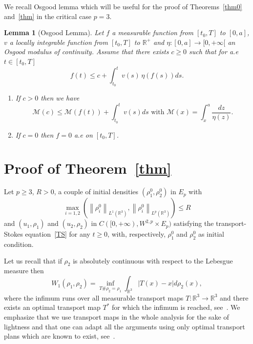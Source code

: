 \documentclass[10pt]{amsart}
\newtheorem{lemm}[theo]{Lemma}\newtheorem{prop}[theo]{Proposition}\newtheorem{coro}[theo]{Corollary}\newtheorem{conj}[theo]{Conjecture}
\theoremstyle{definition}\newtheorem{defi}[theo]{Definition}\newtheorem{rema}[theo]{Remark}\newtheorem{exam}[theo]{Example}\newtheorem{exem}[theo]{Example}\newtheorem{nota}[theo]{Notation}
\newcommand{\R}{\mathbb{R}}
\newcommand{\clM}{\mathcal{M}}
\renewcommand{\leq}{\leqslant}
\renewcommand{\geq}{\geqslant}
\begin{document}
We recall Osgood lemma which will be useful for the proof of Theorems~\ref{thm0} and~\ref{thm} in the critical case $p=3$.

\begin{lemm}[Osgood Lemma]\label{Osgood}
Let $f$ a measurable function from $[t_0,T]$ to $[0,a]$, $v$ a locally integrable function from $[t_0,T]$ to $\R^+$ and $ \eta: [0,a] \to [0,+\infty[$ an Osgood modulus of continuity. Assume that there exists $c \geq0$ such that for a.e $t\in[t_0,T]$
\[
f(t) \leq c+\int_{t_0}^t v(s)\, \eta(f(s)) ds.
\]
\begin{enumerate}
\item\label{lemm3.8.1} If $c>0$ then we have
\[
\clM(c) \leq \clM(f(t)) + \int_{t_0}^t v(s) ds \text{ with } \clM(x)=\int_x^a \frac{dz}{\eta(z)}.
\]
\item\label{lemm3.8.2} If $c=0$ then $f=0$ a.e on $[t_0,T]$.
\end{enumerate}
\end{lemm}



\section{Proof of Theorem~\ref{thm} }\label{sec-stabb}

Let $p\geq 3$, $R>0$, a couple of initial densities
$ (\rho_1^0, \rho_2^0)$ in $E_p $ with
\[
\max_{i=1,2} \left(\left\|\rho_i^0\right\|_{ L^1\left(\R^3\right)}, \left\|\rho_i^0\right\|_{ L^p \left(\R^3\right)}\right) \leq R
\]
and $ (u_1,\rho_1) $ and $ (u_2,\rho_2) $ in $C([0,+\infty),W^{2,p} \times E_p)$ satisfying the transport-Stokes equation~\eqref{TS} for any $t\geq 0$, with, respectively, $ \rho_1^0 $ and $\rho_2^0 $ as initial condition.


Let us recall that if $\rho_2$ is absolutely continuous with respect to the Lebesgue measure then
\begin{equation}\label{W-infi}
W_1 (\rho_1,\rho_2)= \underset{T\# \rho_2=\rho_1} \inf \int_{\R^3} |T(x)-x|d\rho_2(x),
\end{equation}
where the infimum runs over all measurable transport maps $T : \R^3 \to \R^3$ and there exists an optimal transport map $T^*$ for which the infimum is reached, see~\cite[Theorem~1.5]{Santambrogio}. We emphasize that we use transport maps in the whole analysis for the sake of lightness and that one can adapt all the arguments using only optimal transport plans which are known to exist, see~\cite[Theorem~1.7]{Santambrogio_book}.
\end{document}
